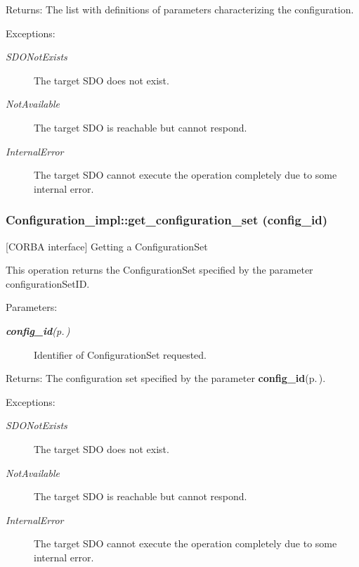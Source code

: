 \begin{Desc}
\item[Returns:]The list with definitions of parameters characterizing the configuration. \end{Desc}
\begin{Desc}
\item[Exceptions:]
\begin{description}
\item[{\em SDONot\-Exists}]The target SDO does not exist. \item[{\em Not\-Available}]The target SDO is reachable but cannot respond. \item[{\em Internal\-Error}]The target SDO cannot execute the operation completely due to some internal error.\end{description}
\end{Desc}
\subsubsection{\setlength{\rightskip}{0pt plus 5cm}Configuration\_\-impl::get\_\-configuration\_\-set ({\bf config\_\-id})}\label{classConfiguration__impl_Configuration__impla11}


[CORBA interface] Getting a Configuration\-Set 

This operation returns the Configuration\-Set specified by the parameter configuration\-Set\-ID.

\begin{Desc}
\item[Parameters:]
\begin{description}
\item[{\em {\bf config\_\-id}{\rm (p.\,\pageref{classConfiguration__impl_1_1config__id})}}]Identifier of Configuration\-Set requested. \end{description}
\end{Desc}
\begin{Desc}
\item[Returns:]The configuration set specified by the parameter {\bf config\_\-id}{\rm (p.\,\pageref{classConfiguration__impl_1_1config__id})}. \end{Desc}
\begin{Desc}
\item[Exceptions:]
\begin{description}
\item[{\em SDONot\-Exists}]The target SDO does not exist. \item[{\em Not\-Available}]The target SDO is reachable but cannot respond. \item[{\em Internal\-Error}]The target SDO cannot execute the operation completely due to some internal error.\end{description}
\end{Desc}
